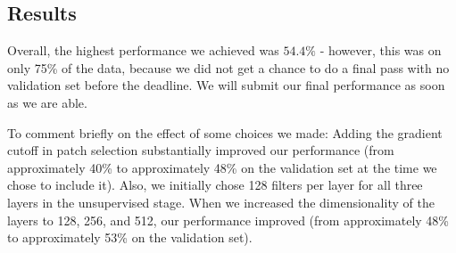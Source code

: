 \documentclass{article} %
\begin{document}
\subsection{Results}

Overall, the highest performance we achieved was $54.4\%$ - however, this was on only 75\% of the data, because we did not get a chance to do a final pass with no validation set before the deadline. We will submit our final performance as soon as we are able.

To comment briefly on the effect of some choices we made: Adding the gradient cutoff in patch selection substantially improved our performance (from approximately 40\% to approximately 48\% on the validation set at the time we chose to include it). Also, we initially chose 128 filters per layer for all three layers in the unsupervised stage. When we increased the dimensionality of the layers to 128, 256, and 512, our performance improved (from approximately 48\% to approximately 53\% on the validation set).
\end{document}
